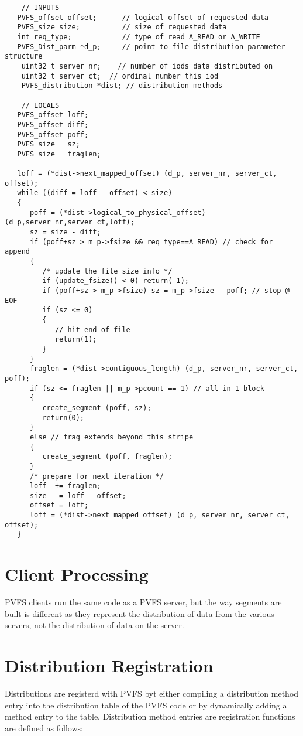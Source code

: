 \documentclass[11pt]{article}
\begin{document}
\begin{verbatim}
	// INPUTS
   PVFS_offset offset;      // logical offset of requested data
   PVFS_size size;          // size of requested data
   int req_type;            // type of read A_READ or A_WRITE
   PVFS_Dist_parm *d_p;     // point to file distribution parameter structure
	uint32_t server_nr;    // number of iods data distributed on
	uint32_t server_ct;  // ordinal number this iod
	PVFS_distribution *dist; // distribution methods

	// LOCALS
   PVFS_offset loff;
   PVFS_offset diff;
   PVFS_offset poff;
   PVFS_size   sz;
   PVFS_size   fraglen;

   loff = (*dist->next_mapped_offset) (d_p, server_nr, server_ct, offset);
   while ((diff = loff - offset) < size)
   {
      poff = (*dist->logical_to_physical_offset)(d_p,server_nr,server_ct,loff);
      sz = size - diff;
      if (poff+sz > m_p->fsize && req_type==A_READ) // check for append 
      {
         /* update the file size info */
         if (update_fsize() < 0) return(-1);
         if (poff+sz > m_p->fsize) sz = m_p->fsize - poff; // stop @ EOF
         if (sz <= 0)
         {
            // hit end of file
            return(1);
         }
      }
      fraglen = (*dist->contiguous_length) (d_p, server_nr, server_ct, poff);
      if (sz <= fraglen || m_p->pcount == 1) // all in 1 block
      {
         create_segment (poff, sz);
         return(0);
      }
      else // frag extends beyond this stripe
      {
         create_segment (poff, fraglen);
      }
      /* prepare for next iteration */
      loff  += fraglen;
      size  -= loff - offset;
      offset = loff;
      loff = (*dist->next_mapped_offset) (d_p, server_nr, server_ct, offset);
   }
\end{verbatim}

\section{Client Processing}

PVFS clients run the same code as a PVFS server, but the way segments
are built is different as they represent the distribution of data from
the various servers, not the distribution of data on the server.

\section{Distribution Registration}

Distributions are registerd with PVFS byt either compiling a
distribution method entry into the distribution table of the PVFS code
or by dynamically adding a method entry to the table.   Distribution
method entries are registration functions are defined as follows:
\end{document}
